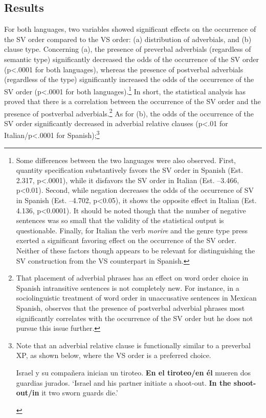 \documentclass[output=paper,colorlinks,citecolor=brown,
]{langscibook}
\begin{document}
\subsection{Results}\label{sec:nishida:3-2}

For both languages, two variables showed significant effects on the occurrence of the SV order compared to the VS order: (a) distribution of adverbials, and (b) clause type. Concerning (a), the presence of preverbal adverbials (regardless of semantic type) significantly decreased the odds of the occurrence of the SV order (p<.0001 for both languages), whereas the presence of postverbal adverbials (regardless of the type) significantly increased the odds of the occurrence of the SV order (p<.0001 for both languages).\footnote{Some differences between the two languages were also observed. First, quantity specification substantively favors the SV order in Spanish (Est. 2.317, p<.0001), while it disfavors the SV order in Italian (Est. –3.466, p<0.01). Second, while negation decreases the odds of the occurrence of SV in Spanish (Est. –4.702, p<0.05), it shows the opposite effect in Italian (Est. 4.136, p<0.0001). It should be noted though that the number of negative sentences was so small that the validity of the statistical output is questionable. Finally, for Italian the verb \textit{morire} and the genre type press exerted a significant favoring effect on the occurrence of the SV order. Neither of these factors though appears to be relevant for distinguishing the SV construction from the VS counterpart in Spanish.} In short, the statistical analysis has proved that there is a correlation between the occurrence of the SV order and the presence of postverbal adverbials.\footnote{That placement of adverbial phrases has an effect on word order choice in Spanish intransitive sentences is not completely new. For instance, in a sociolinguistic treatment of word order in unaccusative sentences in Mexican Spanish, \citet{roggia2018investigation} observes that the presence of postverbal adverbial phrases most significantly correlates with the occurrence of the SV order but he does not pursue this issue further.
} As for (b), the odds of the occurrence of the SV order significantly decreased in adverbial relative clauses (p<.01 for Italian/p<.0001 for Spanish);\footnote{Note that an adverbial relative clause is functionally similar to a preverbal XP, as shown below, where the VS order is a preferred choice.

\begin{exe} %
    \ex\label{ex:nishida:i} 
    Israel y su compañera inician un tiroteo. \textbf{En el tiroteo/en él} mueren dos guardias jurados.
        \glt ‘Israel and his partner initiate a shoot-out. \textbf{In the shoot-out/in} it two sworn guards die.’
\end{exe}

}
\end{document}
